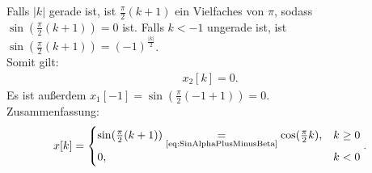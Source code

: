 Falls $|k|$ gerade ist, ist $\frac{\pi}{2}(k+1)$ ein Vielfaches von $\pi$, sodass $\sin(\frac{\pi}{2}(k+1))=0$ ist.
Falls $k<-1$ ungerade ist, ist $\sin(\frac{\pi}{2}(k+1))=(-1)^{\frac{|k|}{2}}$.\\
Somit gilt:
\begin{align}
	x_2[k]=0.
\end{align}
Es ist außerdem $x_1[-1] =\sin(\frac{\pi}{2}(-1+1))=0$. \\
Zusammenfassung:
\begin{align}
	x[k]=\begin{cases}
		\sin(\frac{\pi}{2}(k+1))\underset{\text{\ref{eq:SinAlphaPlusMinusBeta}}}{=}\cos(\frac{\pi}{2}k), &k\geq 0 \\
		0, &k<0
	\end{cases}.
\end{align}
